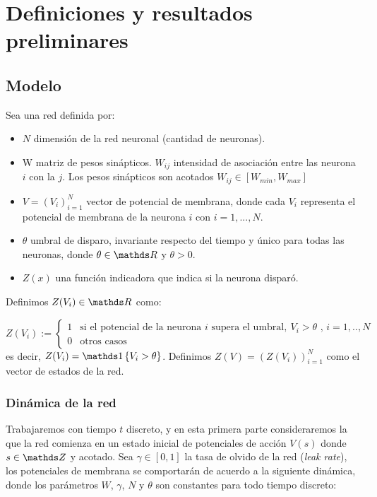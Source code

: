 \section{Definiciones y resultados preliminares}

\subsection{Modelo}

Sea una red definida por:

\begin{itemize}
    \item $N$ dimensión de la red neuronal (cantidad de neuronas).
    \item W matriz de pesos sinápticos. $W_{ij}$ intensidad de asociación entre las neurona $i$ con la $j$. Los pesos sinápticos son acotados $W_{ij} \in [W_{min},W_{max}]$
    \item $V=(V_i)_{i=1}^N$ vector de potencial de membrana, donde cada $V_i$ representa el potencial de membrana de la neurona $i$ con $i={1,...,N}$.
    \item $\theta$ umbral de disparo, invariante respecto del tiempo y único para todas las neuronas, donde $\theta \in \reals$ y $\theta >0$.
    \item $Z(x)$ una función indicadora que indica si la neurona disparó.
\end{itemize}

Definimos $Z(V_i) \in \reals$ como:

\begin{equation*}
    Z(V_i) :=  \left\{ \begin{array}{ll}
            1   & \text{si el potencial de la neurona } i \text{ supera el umbral}, \ V_i > \theta \text{ , } i={1,..,N} \\ 
            0  & \text{otros casos}
            \end{array}\right.
    \label{eqn:indicadoraV}
\end{equation*}
es decir, $Z(V_i)=\indi{V_i>\theta}$. Definimos $Z(V)= (Z(V_i))^N_{i=1}$ como el vector de estados de la red.

\subsubsection{Dinámica de la red}

Trabajaremos con tiempo $t$ discreto, y en esta primera parte consideraremos la que la red comienza en un estado inicial de potenciales de acción $V(s)$ donde $s \in \enteros$ y acotado. 
Sea $\gamma \in [0,1]$ la tasa de olvido de la red (\emph{leak rate}), los potenciales de membrana se comportarán de acuerdo a la siguiente dinámica, donde los parámetros $W$, $\gamma$, $N$ y $\theta$ son constantes para todo tiempo discreto:


